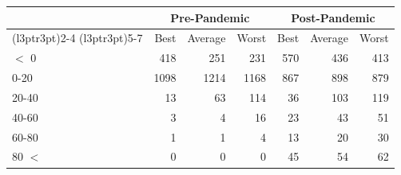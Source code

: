 
\begin{tabular}[t]{lrrrrrr}
\toprule
\multicolumn{1}{c}{ } & \multicolumn{3}{c}{Pre-Pandemic} & \multicolumn{3}{c}{Post-Pandemic} \\
\cmidrule(l{3pt}r{3pt}){2-4} \cmidrule(l{3pt}r{3pt}){5-7}
 & Best & Average & Worst & Best & Average & Worst\\
\midrule
$<$ 0 & 418 & 251 & 231 & 570 & 436 & 413\\
0-20 & 1098 & 1214 & 1168 & 867 & 898 & 879\\
20-40 & 13 & 63 & 114 & 36 & 103 & 119\\
40-60 & 3 & 4 & 16 & 23 & 43 & 51\\
60-80 & 1 & 1 & 4 & 13 & 20 & 30\\
80 $<$ & 0 & 0 & 0 & 45 & 54 & 62\\
\bottomrule
\end{tabular}
